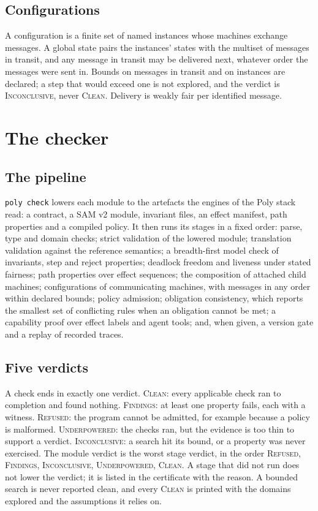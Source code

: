 \documentclass[11pt]{article}
\begin{document}
\subsection{Configurations}

A configuration is a finite set of named instances whose machines exchange messages. A global state pairs the instances' states with the multiset of messages in transit, and any message in transit may be delivered next, whatever order the messages were sent in. Bounds on messages in transit and on instances are declared; a step that would exceed one is not explored, and the verdict is \textsc{Inconclusive}, never \textsc{Clean}. Delivery is weakly fair per identified message.

\section{The checker}
\label{sec:checker}

\subsection{The pipeline}

\texttt{poly check} lowers each module to the artefacts the engines of the Poly stack read: a contract, a SAM v2 module, invariant files, an effect manifest, path properties and a compiled policy. It then runs its stages in a fixed order: parse, type and domain checks; strict validation of the lowered module; translation validation against the reference semantics; a breadth-first model check of invariants, step and reject properties; deadlock freedom and liveness under stated fairness; path properties over effect sequences; the composition of attached child machines; configurations of communicating machines, with messages in any order within declared bounds; policy admission; obligation consistency, which reports the smallest set of conflicting rules when an obligation cannot be met; a capability proof over effect labels and agent tools; and, when given, a version gate and a replay of recorded traces.

\subsection{Five verdicts}

A check ends in exactly one verdict. \textsc{Clean}: every applicable check ran to completion and found nothing. \textsc{Findings}: at least one property fails, each with a witness. \textsc{Refused}: the program cannot be admitted, for example because a policy is malformed. \textsc{Underpowered}: the checks ran, but the evidence is too thin to support a verdict. \textsc{Inconclusive}: a search hit its bound, or a property was never exercised. The module verdict is the worst stage verdict, in the order \textsc{Refused}, \textsc{Findings}, \textsc{Inconclusive}, \textsc{Underpowered}, \textsc{Clean}. A stage that did not run does not lower the verdict; it is listed in the certificate with the reason. A bounded search is never reported clean, and every \textsc{Clean} is printed with the domains explored and the assumptions it relies on.
\end{document}
